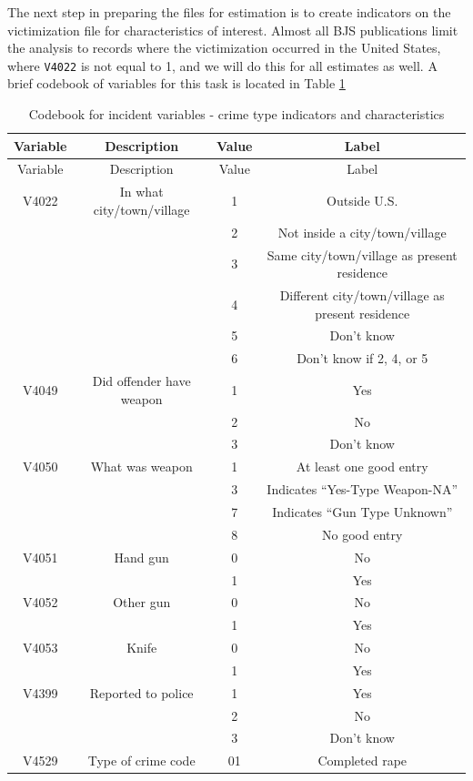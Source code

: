 \documentclass[
]{krantz}
\begin{document}
The next step in preparing the files for estimation is to create indicators on the victimization file for characteristics of interest. Almost all BJS publications limit the analysis to records where the victimization occurred in the United States, where \texttt{V4022} is not equal to 1, and we will do this for all estimates as well. A brief codebook of variables for this task is located in Table \ref{tab:cb-crimetype}

\begin{longtable}[]{@{}cccc@{}}
\caption{\label{tab:cb-crimetype} Codebook for incident variables - crime type indicators and characteristics}\tabularnewline
\toprule\noalign{}
Variable & Description & Value & Label \\
\midrule\noalign{}
\endfirsthead
\toprule\noalign{}
Variable & Description & Value & Label \\
\midrule\noalign{}
\endhead
\bottomrule\noalign{}
\endlastfoot
V4022 & In what city/town/village & 1 & Outside U.S. \\
& & 2 & Not inside a city/town/village \\
& & 3 & Same city/town/village as present residence \\
& & 4 & Different city/town/village as present residence \\
& & 5 & Don't know \\
& & 6 & Don't know if 2, 4, or 5 \\
V4049 & Did offender have weapon & 1 & Yes \\
& & 2 & No \\
& & 3 & Don't know \\
V4050 & What was weapon & 1 & At least one good entry \\
& & 3 & Indicates ``Yes-Type Weapon-NA'' \\
& & 7 & Indicates ``Gun Type Unknown'' \\
& & 8 & No good entry \\
V4051 & Hand gun & 0 & No \\
& & 1 & Yes \\
V4052 & Other gun & 0 & No \\
& & 1 & Yes \\
V4053 & Knife & 0 & No \\
& & 1 & Yes \\
V4399 & Reported to police & 1 & Yes \\
& & 2 & No \\
& & 3 & Don't know \\
V4529 & Type of crime code & 01 & Completed rape \\

\end{longtable}
\end{document}
